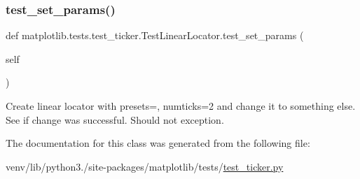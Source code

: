 \mbox{\label{classmatplotlib_1_1tests_1_1test__ticker_1_1TestLinearLocator_ab6a0adf9a5969ef0c42fd9cc28064293}} 
\subsubsection{\texorpdfstring{test\+\_\+set\+\_\+params()}{test\_set\_params()}}
{\footnotesize\ttfamily def matplotlib.\+tests.\+test\+\_\+ticker.\+Test\+Linear\+Locator.\+test\+\_\+set\+\_\+params (\begin{DoxyParamCaption}\item[{}]{self }\end{DoxyParamCaption})}

\begin{DoxyVerb}Create linear locator with presets={}, numticks=2 and change it to
something else. See if change was successful. Should not exception.
\end{DoxyVerb}
 

The documentation for this class was generated from the following file\+:\begin{DoxyCompactItemize}
\item 
venv/lib/python3./site-\/packages/matplotlib/tests/\hyperlink{test__ticker_8py}{test\+\_\+ticker.\+py}\end{DoxyCompactItemize}

